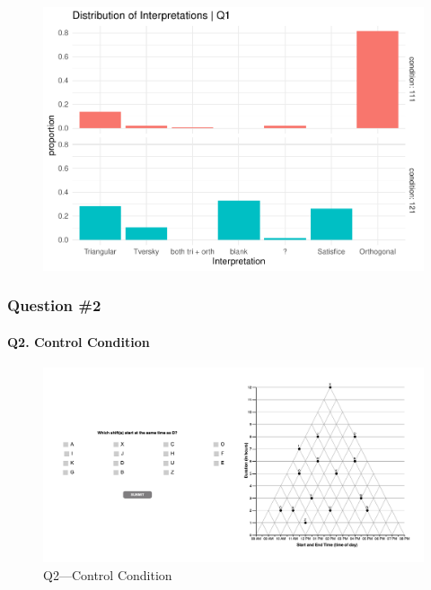 \documentclass[
  letterpaper,
  DIV=11,
  numbers=noendperiod]{scrreprt}
\let\oldparagraph\paragraph
\renewcommand{\paragraph}[1]{\oldparagraph{#1}\mbox{}}
\begin{document}
\begin{figure}[H]

{\centering \includegraphics{analysis/SGC3A/2_sgc3A_scoring_files/figure-pdf/Q1-distribution-2.pdf}

}

\end{figure}

\hypertarget{question-2}{%
\subsubsection{Question \#2}\label{question-2}}

\hypertarget{q2.-control-condition}{%
\paragraph{Q2. Control Condition}\label{q2.-control-condition}}

\begin{figure}

{\centering \includegraphics{analysis/SGC3A/static/questions/Q2_111.png}

}

\caption{\label{fig-Q2-111}Q2---Control Condition}

\end{figure}
\end{document}
